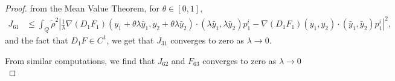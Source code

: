 \documentclass[10pt,a4paper]{amsart}
\begin{document}
\begin{proof}
    \noindent from the Mean Value Theorem, for $\theta \in [0,1]$,
    \begin{equation*}
        \begin{split}
            J_{61} &\leq \int_Q \tilde\rho^2 \left| \frac{1}{\lambda}
            \nabla (D_1 F_1) (y_1+ \theta\lambda \bar y_1,y_2+\theta\lambda \bar y_2)\cdot(\lambda \bar y_1,\lambda \bar y_2) p^i_1 - \nabla (D_1 F_1)(y_1,y_2)\cdot(\bar y_1,\bar y_2)p^i_1
            \right|^2,
        \end{split}
    \end{equation*}
    and the fact that $D_1 F \in C^1$, we get that $J_{31}$ converges to zero as $\lambda \to 0$. 
    
   \noindent  From similar computations, we find  that $J_{62}$ and $F_{63}$ converges to zero as $\lambda \to 0$
    

\end{proof}
\end{document}
